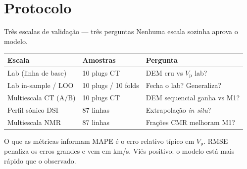 \documentclass[aspectratio=169,10pt]{beamer}
\newcommand{\Vp}{\ensuremath{V_{\mathrm{p}}}}
\begin{document}
\section{Protocolo}

\begin{frame}{Três escalas de validação --- três perguntas}
  \footnotesize
  Nenhuma escala sozinha aprova o modelo.
  \vspace{0.08cm}
  \centering
  \scriptsize
  \begin{tabular}{lll}
    \toprule
    Escala & Amostras & Pergunta \\
    \midrule
    Lab (linha de base) & 10 plugs CT & DEM cru vs \Vp{} lab? \\
    Lab in-sample / LOO & 10 plugs / 10 folds & Fecha o lab? Generaliza? \\
    Multiescala CT (A/B) & 10 plugs CT & DEM sequencial ganha vs M1? \\
    Perfil sónico DSI & 87 linhas & Extrapolação \emph{in situ}? \\
    Multiescala NMR & 87 linhas & Frações CMR melhoram M1? \\
    \bottomrule
  \end{tabular}
  \vspace{0.12cm}
  \begin{block}{O que as métricas informam}
    \scriptsize
    MAPE é o erro relativo típico em \Vp{}.
    RMSE penaliza os erros grandes e vem em km/s.
    Viés positivo: o modelo está mais rápido que o observado.
  \end{block}
\end{frame}
\end{document}
